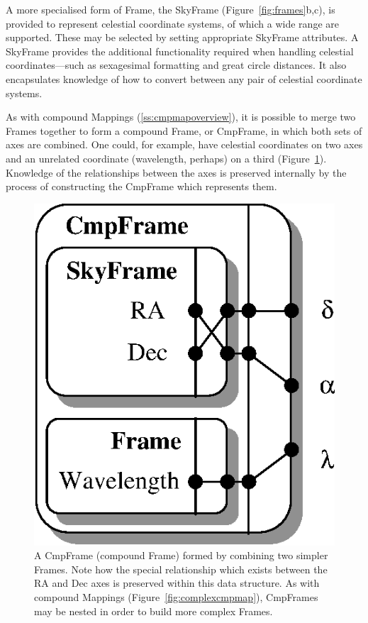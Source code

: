 \documentclass[twoside,11pt]{article}
\newenvironment{latexonly}{}{}
\newcommand{\htmlref}[2]{#1}
\newcommand{\secref}[1]{\S\ref{#1}}
\renewcommand{\secref}[1]{\ref{#1}}
\begin{document}
A more specialised form of Frame, the SkyFrame
(Figure~\ref{fig:frames}b,c), is provided to represent celestial
coordinate systems, of which a wide range are supported.  These may be
selected by setting appropriate SkyFrame attributes.  A SkyFrame
provides the additional functionality required when handling celestial
coordinates---such as sexagesimal formatting and great circle
distances.  It also encapsulates knowledge of how to convert between
any pair of celestial coordinate systems.

\begin{latexonly}
   As with compound Mappings (\secref{ss:cmpmapoverview}), it is possible
   to merge two Frames together to form a compound Frame, or \htmlref{CmpFrame}{CmpFrame}, in
   which both sets of axes are combined.  One could, for example, have
   celestial coordinates on two axes and an unrelated coordinate
   (wavelength, perhaps) on a third (Figure~\ref{fig:cmpframe}).
   Knowledge of the relationships between the axes is preserved
   internally by the process of constructing the CmpFrame which
   represents them.
   \begin{figure}
   \begin{center}
   \includegraphics[scale=0.85]{sun211_figures/cmpframe.eps}
   \caption{A CmpFrame (compound Frame) formed by combining two simpler
   Frames. Note how the special relationship which exists between the RA
   and Dec axes is preserved within this data structure. As with compound
   Mappings (Figure~\ref{fig:complexcmpmap}), CmpFrames may be nested in
   order to build more complex Frames.}
   \label{fig:cmpframe}
   \end{center}
   \end{figure}
\end{latexonly}
\end{document}
